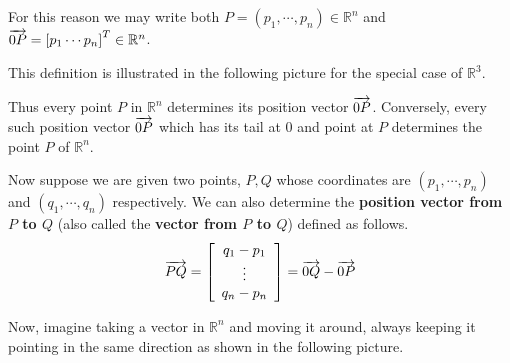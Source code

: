 For this reason we may write both $P=\left( p_{1},\cdots ,p_{n}\right)  \in \mathbb{R}^{n}$
and  $\overrightarrow{0P} = \left[ p_{1} \cdots p_{n} \right]^T \in \mathbb{R}^{n}$. 

This definition is illustrated in the following picture for the
special case of $\mathbb{R}^{3}$.

\begin{center}
\par{}\label{fig:RnVectorsRn-tikz02}%

\end{center}

Thus every point $P$ in $\mathbb{R}^{n}$ determines its position
vector $\overrightarrow{0P}$. Conversely, every such position vector $\overrightarrow{0P}$
which has its tail at $0$ and point at $P$ determines the point $P$ of
$\mathbb{R}^{n}$.

Now suppose we are given two points, $P,Q$ whose
coordinates are $\left( p_{1},\cdots ,p_{n}\right) $ and $\left(
q_{1},\cdots ,q_{n}\right) $ respectively. We can also determine the
\textbf{position vector from $P$ to $Q$} (also called the \textbf{vector from $P$ to $Q$}) defined as follows.
\begin{equation*}
\overrightarrow{PQ} = \left[ \begin{array}{c}
q_{1}-p_{1}\\
 \vdots \\
q_{n}-p_{n}
\end{array}
\right] = \overrightarrow{0Q} - \overrightarrow{0P}
\end{equation*}

Now, imagine taking a vector in $\mathbb{R}^n$ and moving it around, always
keeping it pointing in the same direction as shown in the following picture.

